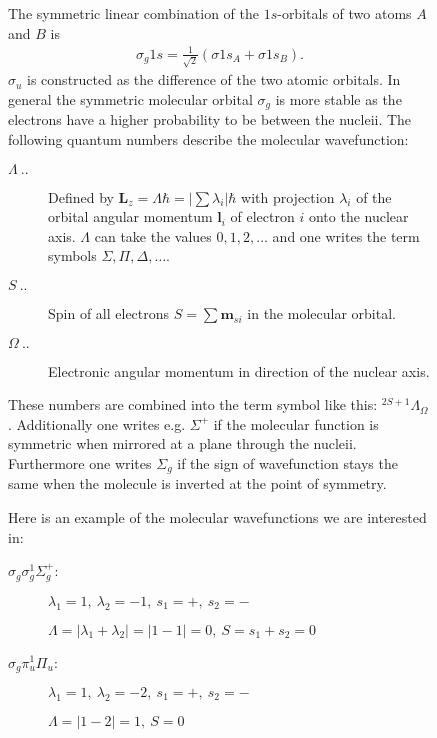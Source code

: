 \begin{figure}[!hbt]
\begin{fenster}
  {\small
    The
    symmetric linear combination of the $1s$-orbitals of two atoms $A$
    and $B$ is 
    \begin{align*} 
      \sigma_g1s=\frac{1}{\sqrt2}(\sigma 1s_A+\sigma 1s_B).
    \end{align*}
    $\sigma_u$ is constructed as the difference of the two atomic orbitals.
    In general the symmetric molecular orbital $\sigma_g$ is more stable as
    the electrons have a higher probability to be between the nucleii.
    The following quantum numbers describe the molecular wavefunction:
    \begin{description}
    \item[$\Lambda\ ..$] 
      
      Defined by $\mathbf{L}_z=\Lambda\hbar=|\sum\lambda_i|\hbar$ with
      projection $\lambda_i$ of the orbital angular momentum $\mathbf{l}_i$ of
      electron $i$ onto the nuclear axis. $\Lambda$ can take the
      values $0,1,2,\ldots$ and one writes the term symbols
      $\Sigma,\Pi,\Delta,\ldots$.
      
    \item[$S\ ..$]
      
      Spin of all electrons $S=\sum\mathbf{m}_{si}$ in the molecular orbital. 
      
    \item[$\Omega\ ..$] 
      
      Electronic angular momentum in direction of the nuclear axis.
      
    \end{description}
    These numbers are combined into the term symbol like this:
    ${}^{2S+1}\Lambda_\Omega$.  Additionally one writes e.g. $\Sigma^+$
    if the molecular function is symmetric when mirrored at a plane
    through the nucleii.  Furthermore one writes $\Sigma_g$ if the sign
    of wavefunction stays the same when the molecule is inverted at the
    point of symmetry.
    
    Here is an example of the molecular wavefunctions we are
    interested in:
    
    \begin{description}
    \item[$\sigma_g\sigma_g^1\Sigma_g^+$:]
      
      $\lambda_1=1,\ \lambda_2=-1,\ s_1=+,\ s_2=-$
      
      $\Lambda=|\lambda_1+\lambda_2|=|1-1|=0,\ S=s_1+s_2=0$
      
    \item[$\sigma_g\pi_u^1\Pi_u$:]
      
      $\lambda_1=1,\ \lambda_2=-2,\ s_1=+,\ s_2=-$
      
      $\Lambda=|1-2|=1,\ S=0$
      
    \end{description}
  }
\end{fenster}
\end{figure}



